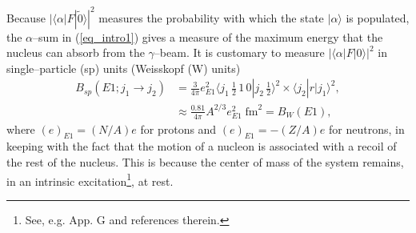 Because $|\langle \alpha|F|\tilde 0\rangle|^2$ measures the probability with which the state $|\alpha\rangle$ is populated, the $\alpha$--sum in (\ref{eq_intro1}) gives a measure of the maximum energy that the nucleus can absorb from the $\gamma$--beam. It is customary to measure  $|\langle \alpha|F|0\rangle|^2$ in single--particle (sp) units (Weisskopf (W) units)
\begin{align}\label{eq1.2.5}
\nonumber B_{sp}(E1;j_1\rightarrow j_2)&=\frac{3}{4\pi}e^2_{E1}\langle j_1\, \tfrac{1}{2}\,1\,0|j_2\,\tfrac{1}{2}\rangle^2\times \langle j_2|r|j_1\rangle^2,\\
&\approx \frac{0.81}{4\pi}A^{2/3}e^2_{E1}\;\text{fm}^2=B_W(E1),
\end{align}
where $(e)_{E1}=(N/A)e$ for protons and  $(e)_{E1}=-(Z/A)e$ for neutrons, in keeping with the fact that the motion of a nucleon is associated with a recoil of the rest of the nucleus. This is because the center of mass  of the system remains,   in an intrinsic excitation\footnote{See, e.g. \cite{Broglia:16} App. G and references therein.}, at rest. 


